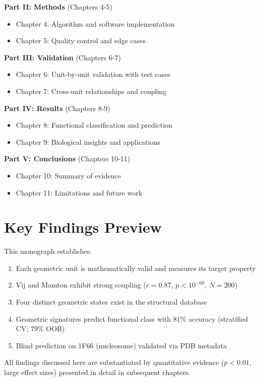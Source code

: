 \textbf{Part II: Methods} (Chapters 4-5)
\begin{itemize}
    \item Chapter 4: Algorithm and software implementation
    \item Chapter 5: Quality control and edge cases
\end{itemize}

\textbf{Part III: Validation} (Chapters 6-7)
\begin{itemize}
    \item Chapter 6: Unit-by-unit validation with test cases
    \item Chapter 7: Cross-unit relationships and coupling
\end{itemize}

\textbf{Part IV: Results} (Chapters 8-9)
\begin{itemize}
    \item Chapter 8: Functional classification and prediction
    \item Chapter 9: Biological insights and applications
\end{itemize}

\textbf{Part V: Conclusions} (Chapters 10-11)
\begin{itemize}
    \item Chapter 10: Summary of evidence
    \item Chapter 11: Limitations and future work
\end{itemize}

\section{Key Findings Preview}

This monograph establishes:

\begin{keyresult}
    \begin{enumerate}
        \item Each geometric unit is mathematically valid and measures its target property
        \item Vij and Mamton exhibit strong coupling ($r = 0.87$, $p < 10^{-60}$, $N=200$)
        \item Four distinct geometric states exist in the structural database
        \item Geometric signatures predict functional class with $81\%$ accuracy (stratified CV; $79\%$ OOB)
        \item Blind prediction on 1F66 (nucleosome) validated via PDB metadata
    \end{enumerate}
\end{keyresult}

All findings discussed here are substantiated by quantitative evidence ($p < 0.01$, large effect sizes) presented in detail in subsequent chapters.
